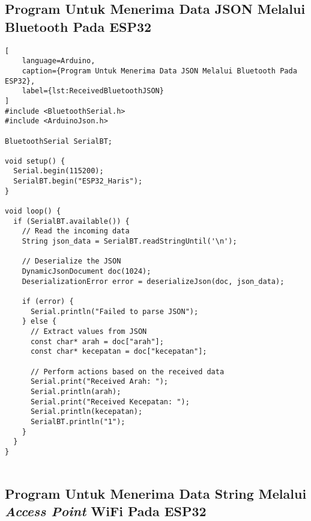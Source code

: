 \subsection*{Program Untuk Menerima Data JSON Melalui Bluetooth Pada ESP32}

\begin{lstlisting}[
    language=Arduino,
    caption={Program Untuk Menerima Data JSON Melalui Bluetooth Pada ESP32},
    label={lst:ReceivedBluetoothJSON}
]
#include <BluetoothSerial.h>
#include <ArduinoJson.h>

BluetoothSerial SerialBT;

void setup() {
  Serial.begin(115200);
  SerialBT.begin("ESP32_Haris");
}

void loop() {
  if (SerialBT.available()) {
    // Read the incoming data
    String json_data = SerialBT.readStringUntil('\n');

    // Deserialize the JSON
    DynamicJsonDocument doc(1024);
    DeserializationError error = deserializeJson(doc, json_data);

    if (error) {
      Serial.println("Failed to parse JSON");
    } else {
      // Extract values from JSON
      const char* arah = doc["arah"];
      const char* kecepatan = doc["kecepatan"];

      // Perform actions based on the received data
      Serial.print("Received Arah: ");
      Serial.println(arah);
      Serial.print("Received Kecepatan: ");
      Serial.println(kecepatan);
      SerialBT.println("1");
    }
  }
}
    
\end{lstlisting}

\subsection*{Program Untuk Menerima Data String Melalui \emph{Access Point} WiFi Pada ESP32}


